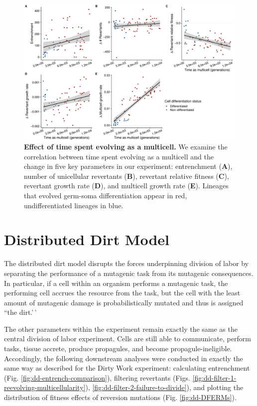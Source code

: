 \documentclass[
]{book}
\begin{document}
\begin{figure}
\centering
\includegraphics{images/Figure_S8_Time_as_multicell_10NOV22.png}
\caption{\label{fig:dw-time-as-mc}\textbf{Effect of time spent evolving as a multicell.} We examine the correlation between time spent evolving as a multicell and the change in five key parameters in our experiment: entrenchment (\textbf{A}), number of unicellular revertants (\textbf{B}), revertant relative fitness (\textbf{C}), revertant growth rate (\textbf{D}), and multicell growth rate (\textbf{E}). Lineages that evolved germ-soma differentiation appear in red, undifferentiated lineages in blue.}
\end{figure}

\hypertarget{distributed-dirt-model}{%
\chapter{Distributed Dirt Model}\label{distributed-dirt-model}}

The distributed dirt model disrupts the forces underpinning division of labor by separating the performance of a mutagenic task from its mutagenic consequences. In particular, if a cell within an organism performs a mutagenic task, the performing cell accrues the resource from the task, but the cell with the least amount of mutagenic damage is probabilistically mutated and thus is assigned ``the dirt.'\,'

The other parameters within the experiment remain exactly the same as the central division of labor experiment. Cells are still able to communicate, perform tasks, tissue accrete, produce propagules, and become propagule-ineligible. Accordingly, the following downstream analyses were conducted in exactly the same way as described for the Dirty Work experiment: calculating entrenchment (Fig. \ref{fig:dd-entrench-comparison}), filtering revertants (Figs. \ref{fig:dd-filter-1-reevolving-multicellularity}), \ref{fig:dd-filter-2-failure-to-divide}), and plotting the distribution of fitness effects of reversion mutations (Fig. \ref{fig:dd-DFERMs}).
\end{document}
